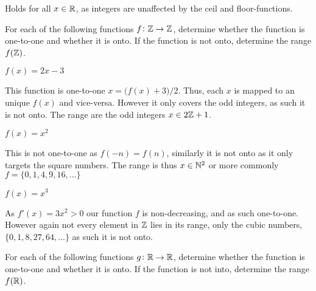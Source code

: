 \documentclass[a4paper, english, 12pt]{article} %
\begin{document}
\begin{answer}
  Holds for all $x \in \mathbb{R}$, as integers are unaffected by the ceil and
  floor-functions. 
\end{answer}



\begin{problem}[2]
  For each of the following functions $f \colon \mathbb{Z} \to \mathbb{Z}$, determine whether
  the function is one-to-one and whether it is onto. If the function is not
  onto, determine the range $f(\mathbb{Z})$.
\end{problem}

\begin{subproblem}[2]
  $f(x) = 2x - 3$
\end{subproblem}

\begin{answer}
  This function is one-to-one $x = \bigl(  f(x) + 3 \bigr)/2$. Thus, each $x$ is
  mapped to an unique $f(x)$ and vice-versa. However it only covers the odd
  integers, as such it is not onto. The range are the odd integers $x \in 2\mathbb{Z} + 1$.
\end{answer}

\begin{subproblem}[4]
  $f(x) = x^2$
\end{subproblem}

\begin{answer}
  This is not one-to-one as $f(-n) = f(n)$, similarly it is not onto as it only
  targets the square numbers. The range is thus $x \in \mathbb{N}^2$ or more commonly $f
  = \{0,1,4,9,16,\ldots\}$ 
\end{answer}

\begin{subproblem}[6]
  $f(x) = x^3$
\end{subproblem}

\begin{answer}
  As $f'(x) = 3x^2 > 0$ our function $f$ is non-decreasing, and as
  such one-to-one. However again not every element in $\mathbb{Z}$ lies in its range,
  only the cubic numbers, $\{0,1,8,27,64,\ldots\}$ as such it is not onto. 
\end{answer}

\begin{problem}
  For each of the following functions $g \colon \mathbb{R} \to \mathbb{R}$, determine whether
  the function is one-to-one and whether it is onto. If the function is not
  into, determine the range $f(\mathbb{R})$.
\end{problem}
\end{document}
